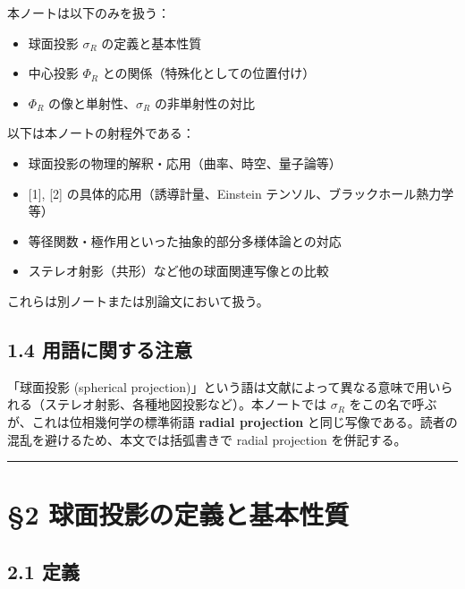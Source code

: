 \documentclass[
]{ltjsarticle}
\providecommand{\tightlist}{%
  \setlength{\itemsep}{0pt}\setlength{\parskip}{0pt}}
\begin{document}
本ノートは以下のみを扱う：

\begin{itemize}
\tightlist
\item
  球面投影 \(\sigma_R\) の定義と基本性質
\item
  中心投影 \(\Phi_R\) との関係（特殊化としての位置付け）
\item
  \(\Phi_R\) の像と単射性、\(\sigma_R\) の非単射性の対比
\end{itemize}

以下は本ノートの射程外である：

\begin{itemize}
\tightlist
\item
  球面投影の物理的解釈・応用（曲率、時空、量子論等）
\item
  {[}1{]}, {[}2{]} の具体的応用（誘導計量、Einstein
  テンソル、ブラックホール熱力学等）
\item
  等径関数・極作用といった抽象的部分多様体論との対応
\item
  ステレオ射影（共形）など他の球面関連写像との比較
\end{itemize}

これらは別ノートまたは別論文において扱う。

\subsection{1.4
用語に関する注意}\label{ux7528ux8a9eux306bux95a2ux3059ux308bux6ce8ux610f}

「球面投影 (spherical
projection)」という語は文献によって異なる意味で用いられる（ステレオ射影、各種地図投影など）。本ノートでは
\(\sigma_R\) をこの名で呼ぶが、これは位相幾何学の標準術語 \textbf{radial
projection} と同じ写像である。読者の混乱を避けるため、本文では括弧書きで
radial projection を併記する。

\begin{center}\rule{0.5\linewidth}{0.5pt}\end{center}

\section{§2
球面投影の定義と基本性質}\label{ux7403ux9762ux6295ux5f71ux306eux5b9aux7fa9ux3068ux57faux672cux6027ux8cea}

\subsection{2.1 定義}\label{ux5b9aux7fa9}
\end{document}
